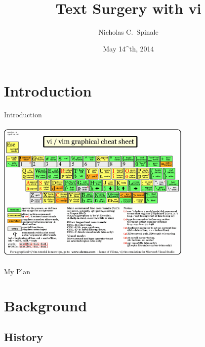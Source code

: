 \documentclass{beamer}
\title{Text Surgery with vi}
\author{Nicholas C.~Spinale}
\institute{DevX \\ Carleton College}
\date{May 14^{th}, 2014}
\begin{document}
            \begin{frame}
            \titlepage
            \end{frame}

    \section*{Introduction}

            \begin{frame}{Introduction}
                \begin{center}
                \includegraphics[width = 9.5cm, height = 7cm]{images/vi_vim_cheat_sheet.png}
                \end{center}
            \end{frame}

            \begin{frame}{My Plan}
            \tableofcontents
            \end{frame}

    \section{Background}

        \subsection{History}
\end{document}
